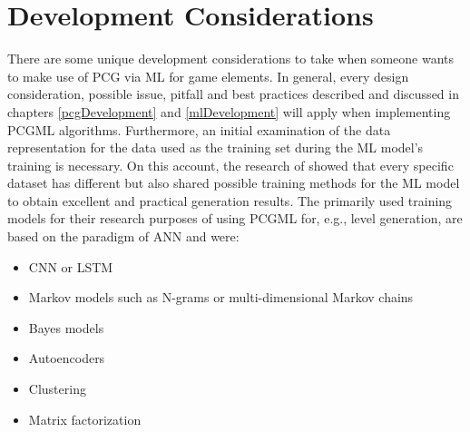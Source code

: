 \documentclass[MGS,Master,english]{twbook}%
\begin{document}
\section{Development Considerations} \label{PCGML::devConsiderations}
There are some unique development considerations to take when someone wants to make use of PCG via ML for game elements. In general, every design consideration, possible issue, pitfall and best practices described and discussed in chapters \ref{pcgDevelopment} and \ref{mlDevelopment} will apply when implementing PCGML algorithms. Furthermore, an initial examination of the data representation for the data used as the training set during the ML model’s training is necessary. On this account, the research of \citep{pcgml::paper} showed that every specific dataset has different but also shared possible training methods for the ML model to obtain excellent and practical generation results. The primarily used training models for their research purposes of using PCGML for, e.g., level generation, are based on the paradigm of \ac{ANN} and were:
\begin{itemize}
	\item \ac{CNN} or \ac{LSTM}
	\item Markov models such as N-grams or multi-dimensional Markov chains
	\item Bayes models
	\item Autoencoders
	\item Clustering
	\item Matrix factorization
\end{itemize} 
\end{document}
